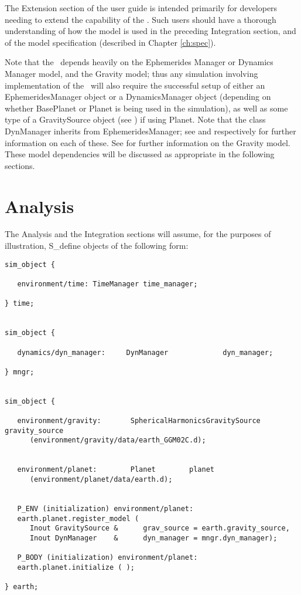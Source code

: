 The Extension section of the user guide is intended primarily for developers
needing to extend the capability of the \planetDesc.  Such users should have a
thorough understanding of how the model is used in the preceding Integration
section, and of the model specification (described in Chapter \ref{ch:spec}).

Note that the \planetDesc\ depends heavily on the Ephemerides Manager or
Dynamics Manager model, and the Gravity model; thus any simulation involving
implementation of the \planetDesc\ will also require the successful setup of
either an EphemeridesManager object or a DynamicsManager object (depending
on whether BasePlanet or Planet is being used in the simulation), as well as
some type of a GravitySource object (see \cite{dynenv:GRAVITY}) if using Planet.
 Note that the class DynManager inherits from EphemeridesManager; see
\cite{dynenv:DYNMANAGER} and \cite{dynenv:EPHEMERIDES} respectively for further
information on each of these. See \cite{dynenv:GRAVITY} for further information
on the Gravity model. These model dependencies will be discussed as appropriate
in the following sections.

\section{Analysis}

The Analysis and the Integration sections will assume, for the purposes of
illustration, S\_define objects of the following form:

\begin{verbatim}
sim_object {

   environment/time: TimeManager time_manager;

} time;


sim_object {

   dynamics/dyn_manager:     DynManager             dyn_manager;

} mngr;


sim_object {

   environment/gravity:       SphericalHarmonicsGravitySource   gravity_source
      (environment/gravity/data/earth_GGM02C.d);


   environment/planet:        Planet        planet
      (environment/planet/data/earth.d);


   P_ENV (initialization) environment/planet:
   earth.planet.register_model (
      Inout GravitySource &      grav_source = earth.gravity_source,
      Inout DynManager    &      dyn_manager = mngr.dyn_manager);

   P_BODY (initialization) environment/planet:
   earth.planet.initialize ( );

} earth;
\end{verbatim}

